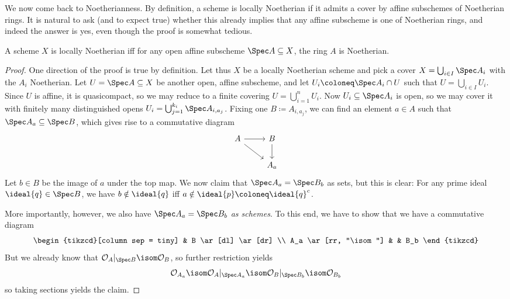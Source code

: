 \documentclass[wip, algebra]{bsteffan-lecturenotes}
\newcommand{\cO}{\mathcal{O}}
\begin{document}
We now come back to Noetherianness.
By definition, a scheme is locally Noetherian if it admits a cover by affine subschemes of Noetherian rings.
It is natural to ask (and to expect true) whether this already implies that any affine subscheme is one of Noetherian rings, and indeed the answer is yes, even though the proof is somewhat tedious.
\begin{proposition}
	A scheme $X$ is locally Noetherian iff for any open affine subscheme $\Spec A \subseteq X$, the ring $A$ is Noetherian.
\end{proposition}
\begin{proof}
	One direction of the proof is true by definition.
	Let thus $X$ be a locally Noetherian scheme and pick a cover $X = \bigcup_{i \in I} \Spec A_i$ with the $A_i$ Noetherian.
	Let $U = \Spec A \subseteq X$ be another open, affine subscheme, and let $U_i \coloneq \Spec A_i \cap U$ such that $U = \bigcup_{i \in I} U_i$.
	Since $U$ is affine, it is quasicompact, so we may reduce to a finite covering $U = \bigcup_{i = 1}^n U_i$.
	Now $U_i \subseteq \Spec A_i$ is open, so we may cover it with finitely many distinguished opens $U_i = \bigcup_{j = 1}^{k_i} \Spec A_{i, a_j}$.
	Fixing one $B \coloneq A_{i, a_j}$, we can find an element $a \in A$ such that $\Spec A_a \subseteq \Spec B$, which gives rise to a commutative diagram
	\begin{equation*}
		\begin{tikzcd}
			A 
					\ar[r]
					\ar[dr]
				& B
					\ar[d]
			\\
				& A_a
		\end{tikzcd}
	\end{equation*}
	Let $b \in B$ be the image of $a$ under the top map.
	We now claim that $\Spec A_a = \Spec B_b$ as sets, but this is clear: 
	For any prime ideal $\ideal{q} \in \Spec B$, we have $b \notin \ideal{q}$ iff $a \notin \ideal{p} \coloneq \ideal{q}^c$.
	
	More importantly, however, we also have $\Spec A_a = \Spec B_b$ \emph{as schemes}.
	To this end, we have to show that we have a commutative diagram
	\begin{equation*}
		\begin{tikzcd}[column sep = tiny]
				& B
					\ar[dl]
					\ar[dr]
			\\
			A_a 
					\ar[rr, "\isom"]
				& & B_b
		\end{tikzcd}
	\end{equation*}
	But we already know that $\cO_A|_{\Spec B} \isom \cO_B$, so further restriction yields 
	\begin{equation*}
		\cO_{A_a} \isom \cO_A|_{\Spec A_a} \isom \cO_B|_{\Spec B_b} \isom \cO_{B_b}
	\end{equation*}
	so taking sections yields the claim.


\end{proof}
\end{document}

